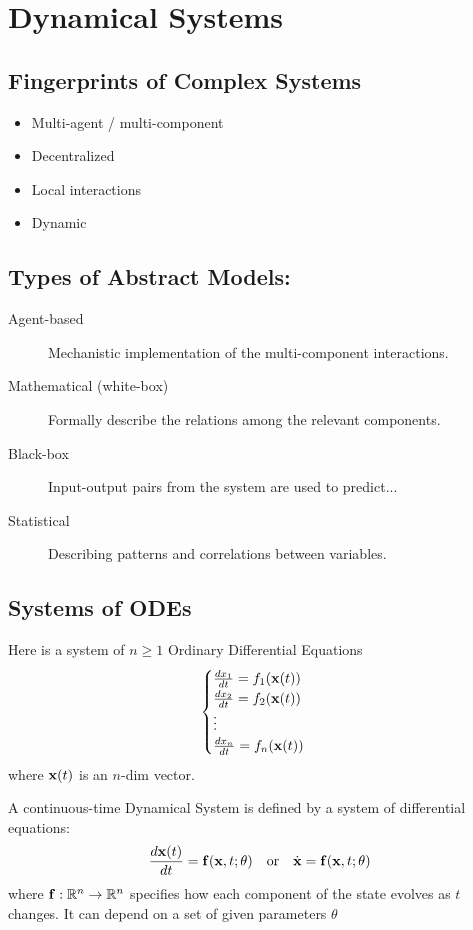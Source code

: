 \chapter*{Dynamical Systems}

\section*{Fingerprints of Complex Systems}

\begin{itemize}
    \item Multi-agent / multi-component 
    \item Decentralized 
    \item Local interactions 
    \item Dynamic
\end{itemize}

\section*{Types of Abstract Models:}

\begin{description}
    \item[Agent-based] Mechanistic implementation of the multi-component interactions.
    \item[Mathematical (white-box)] Formally describe the relations among the relevant components. 
    \item[Black-box] Input-output pairs from the system are used to predict...
    \item[Statistical] Describing patterns and correlations between variables.
\end{description}

\section*{Systems of ODEs}

Here is a system of $n \ge 1$ Ordinary Differential Equations
\[
\begin{cases}
\frac{dx_1}{dt} = f_1(\mathbf{x}(t))\\
\frac{dx_2}{dt} = f_2(\mathbf{x}(t))\\
\vdots \\ 
\frac{dx_n}{dt} = f_n(\mathbf{x}(t))
\end{cases}
\]
where $\mathbf{x}(t)$ is an $n$-dim vector.


A continuous-time Dynamical System is defined by a system of differential equations:
\[
\frac{d\mathbf{x}(t)}{dt} = \mathbf{f}(\mathbf{x}, t; \theta) \quad \text{or} \quad \dot{\mathbf{x}} = \mathbf{f}(\mathbf{x}, t; \theta)
\]
where $\mathbf{f}: \mathbb{R}^n \to \mathbb{R}^n$ specifies how each component of the state evolves as $t$ changes.
It can depend on a set of given parameters $\theta$

